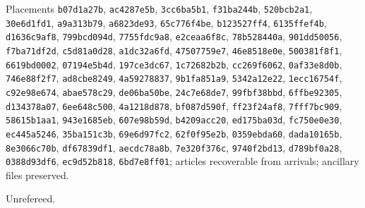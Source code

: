 \documentclass[11pt]{article}
\begin{document}
{{\raggedright\footnotesize Placements \texttt{b07d1a27b}, \texttt{ac4287e5b}, \texttt{3cc6ba5b1}, \texttt{f31ba244b}, \texttt{520bcb2a1}, \texttt{30e6d1fd1}, \texttt{a9a313b79}, \texttt{a6823de93}, \texttt{65c776f4be}, \texttt{b123527ff4}, \texttt{6135ffef4b}, \texttt{d1636c9af8}, \texttt{799bcd094d}, \texttt{7755fdc9a8}, \texttt{e2ceaa6f8c}, \texttt{78b528440a}, \texttt{901dd50056}, \texttt{f7ba71df2d}, \texttt{c5d81a0d28}, \texttt{a1dc32a6fd}, \texttt{47507759e7}, \texttt{46e8518e0e}, \texttt{500381f8f1}, \texttt{6619bd0002}, \texttt{07194e5b4d}, \texttt{197ce3dc67}, \texttt{1c72682b2b}, \texttt{cc269f6062}, \texttt{0af33e8d0b}, \texttt{746e88f2f7}, \texttt{ad8cbe8249}, \texttt{4a59278837}, \texttt{9b1fa851a9}, \texttt{5342a12e22}, \texttt{1ecc16754f}, \texttt{c92e98e674}, \texttt{abae578c29}, \texttt{de06ba50be}, \texttt{24c7e68de7}, \texttt{99fbf38bbd}, \texttt{6ffbe92305}, \texttt{d134378a07}, \texttt{6ee648c500}, \texttt{4a1218d878}, \texttt{bf087d590f}, \texttt{ff23f24af8}, \texttt{7fff7bc909}, \texttt{58615b1aa1}, \texttt{943e1685eb}, \texttt{607e98b59d}, \texttt{b4209acc20}, \texttt{ed175ba03d}, \texttt{fc750e0e30}, \texttt{ec445a5246}, \texttt{35ba151c3b}, \texttt{69e6d97fc2}, \texttt{62f0f95e2b}, \texttt{0359ebda60}, \texttt{dada10165b}, \texttt{8e3066c70b}, \texttt{df67839df1}, \texttt{aecdc78a8b}, \texttt{7e320f376c}, \texttt{9740f2bd13}, \texttt{d789bf0a28}, \texttt{0388d93df6}, \texttt{ec9d52b818}, \texttt{6bd7e8ff01};
articles recoverable from arrivals; ancillary files preserved.\par}
Unrefereed.}
\end{document}

